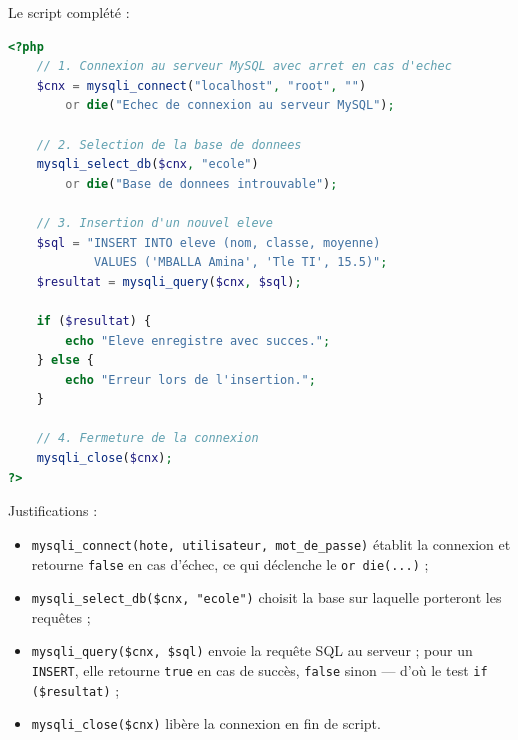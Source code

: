 \documentclass[11pt]{article}
\begin{document}
\begin{corrige}
Le script complété :
\begin{lstlisting}[language=Php]
<?php
    // 1. Connexion au serveur MySQL avec arret en cas d'echec
    $cnx = mysqli_connect("localhost", "root", "")
        or die("Echec de connexion au serveur MySQL");

    // 2. Selection de la base de donnees
    mysqli_select_db($cnx, "ecole")
        or die("Base de donnees introuvable");

    // 3. Insertion d'un nouvel eleve
    $sql = "INSERT INTO eleve (nom, classe, moyenne)
            VALUES ('MBALLA Amina', 'Tle TI', 15.5)";
    $resultat = mysqli_query($cnx, $sql);

    if ($resultat) {
        echo "Eleve enregistre avec succes.";
    } else {
        echo "Erreur lors de l'insertion.";
    }

    // 4. Fermeture de la connexion
    mysqli_close($cnx);
?>
\end{lstlisting}
Justifications :
\begin{itemize}
\item \texttt{mysqli\_connect(hote, utilisateur, mot\_de\_passe)} établit la connexion et retourne \texttt{false} en cas d'échec, ce qui déclenche le \texttt{or die(...)} ;
\item \texttt{mysqli\_select\_db(\$cnx, "ecole")} choisit la base sur laquelle porteront les requêtes ;
\item \texttt{mysqli\_query(\$cnx, \$sql)} envoie la requête SQL au serveur ; pour un \texttt{INSERT}, elle retourne \texttt{true} en cas de succès, \texttt{false} sinon — d'où le test \texttt{if (\$resultat)} ;
\item \texttt{mysqli\_close(\$cnx)} libère la connexion en fin de script.
\end{itemize}
\end{corrige}
\end{document}
